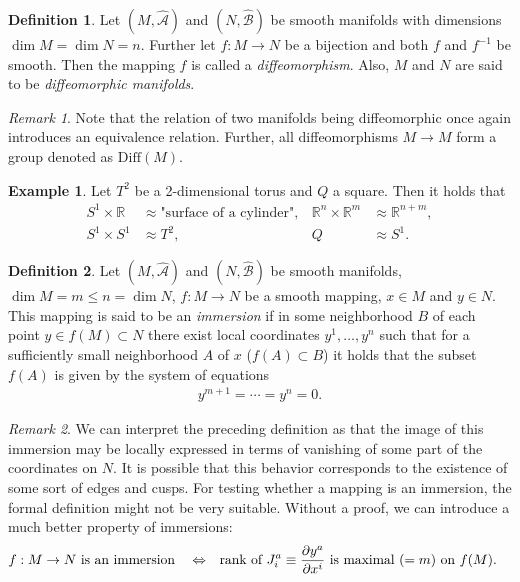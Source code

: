 \documentclass[a4paper,11pt]{article}
\theoremstyle{theorem}
\theoremstyle{remark}
\newtheorem*{remark}{Remark}
\theoremstyle{definition}
\newtheorem{definition}{Definition}
\newtheorem*{example}{Example}
\begin{document}
		\begin{definition}
			Let $(M, \hat{\mathcal A})$ and $(N, \hat{\mathcal B})$ be smooth manifolds with dimensions $\dim M = \dim N = n$. Further let $f: M \to N$ be a bijection and both $f$ and $f^{-1}$ be smooth. Then the mapping $f$ is called a \emph{diffeomorphism}. Also, $M$ and $N$ are said to be \emph{diffeomorphic manifolds}.
		\end{definition}
	
		\begin{remark}
			Note that the relation of two manifolds being diffeomorphic once again introduces an equivalence relation. Further, all diffeomorphisms $M \to M$ form a group denoted as $\mathrm{Diff}(M)$.
		\end{remark}
		
		\begin{example}
			Let $T^2$ be a 2-dimensional torus and $Q$ a square. Then it holds that
			\begin{align*}
				S^1 \times \mathbb R &\approx \text{"surface of a cylinder"},
			&
				\mathbb R^n \times \mathbb R^m &\approx \mathbb R^{n+m},
			\\
				S^1 \times S^1 &\approx T^2,
			&
				Q &\approx S^1.
			\end{align*}
		\end{example}
		
		\begin{definition}
			Let $(M, \hat{\mathcal A})$ and $(N, \hat{\mathcal B})$ be smooth manifolds, $\dim M = m \leq n = \dim N$, $f: M \to N$ be a smooth mapping, $x \in M$ and $y \in N$. This mapping is said to be an \emph{immersion} if in some neighborhood $B$ of each point $y \in f(M) \subset N$ there exist local coordinates $y^1, \dots, y^n$ such that for a sufficiently small neighborhood $A$ of $x$ ($f(A) \subset B$) it holds that the subset $f(A)$ is given by the system of equations
			\begin{align*}
				y^{m+1} = \cdots = y^n = 0.
			\end{align*}
		\end{definition}
		
		\begin{remark}
			We can interpret the preceding definition as that the image of this immersion may be locally expressed in terms of vanishing of some part of the coordinates on $N$. It is possible that this behavior corresponds to the existence of some sort of edges and cusps. For testing whether a mapping is an immersion, the formal definition might not be very suitable. Without a proof, we can introduce a much better property of immersions:
			\begin{align*}
				&\text{$f: M \to N$ is an immersion}
			&
				&\Leftrightarrow
			&
				&\text{rank of $J_i^a \equiv \dfrac{\partial y^a}{\partial x^i}$ is maximal ($=m$) on $f(M)$.}
			\end{align*}
		\end{remark}
		
\end{document}

